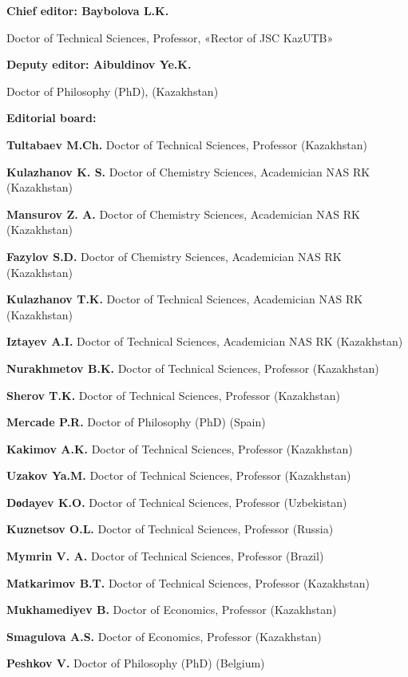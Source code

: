 {\small
\begin{center}
\textbf{Chief editor: Baybolova L.K.}

Doctor of Technical Sciences, Professor, «Rector of JSC KazUTB»

\textbf{Deputy editor: Aibuldinov Ye.K.}

Doctor of Philosophy (PhD), (Kazakhstan)

\textbf{Editorial board:}
\end{center}

\textbf{Tultabaev M.Ch.} Doctor of Technical Sciences, Professor (Kazakhstan)

\textbf{Kulazhanov K. S.} Doctor of Chemistry Sciences, Academician NAS RK (Kazakhstan)

\textbf{Mansurov Z. A.} Doctor of Chemistry Sciences, Academician NAS RK (Kazakhstan)

\textbf{Fazylov S.D.} Doctor of Chemistry Sciences, Academician NAS RK (Kazakhstan)

\textbf{Kulazhanov T.K.} Doctor of Technical Sciences, Academician NAS RK (Kazakhstan)

\textbf{Iztayev A.I.} Doctor of Technical Sciences, Academician NAS RK (Kazakhstan)

\textbf{Nurakhmetov B.K.} Doctor of Technical Sciences, Professor (Kazakhstan)

\textbf{Sherov T.K.} Doctor of Technical Sciences, Professor (Kazakhstan)

\textbf{Mercade P.R.} Doctor of Philosophy (PhD) (Spain)

\textbf{Kakimov A.K.} Doctor of Technical Sciences, Professor (Kazakhstan)

\textbf{Uzakov Ya.M.} Doctor of Technical Sciences, Professor (Kazakhstan)

\textbf{Dоdayev K.O.} Doctor of Technical Sciences, Professor (Uzbekistan)

\textbf{Kuznetsov O.L.} Doctor of Technical Sciences, Professor (Russia)

\textbf{Mymrin V. A.} Doctor of Technical Sciences, Professor (Brazil)

\textbf{Matkarimov B.T.} Doctor of Technical Sciences, Professor (Kazakhstan)

\textbf{Mukhamediyev B.} Doctor of Economics, Professor (Kazakhstan)

\textbf{Smagulova A.S.} Doctor of Economics, Professor (Kazakhstan)

\textbf{Peshkov V.} Doctor of Philosophy (PhD) (Belgium)

}
